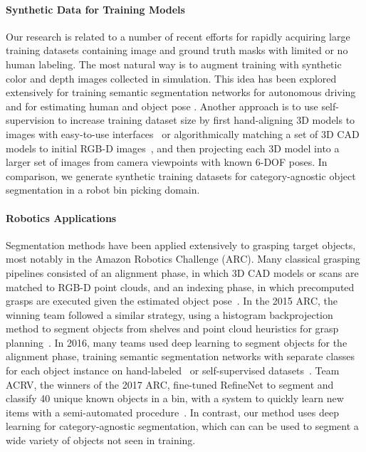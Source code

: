 \documentclass[letterpaper, 10 pt, conference]{ieeeconf}  \pdfoutput=1
\numberwithin{equation}{section}
\begin{document}
\paragraph{Synthetic Data for Training Models}
Our research is related to a number of recent efforts for 
rapidly acquiring large training datasets containing image and 
ground truth masks with limited or no human labeling.
The most natural way is to augment training with synthetic 
color and depth images collected in simulation.
This idea has been explored extensively for training semantic segmentation networks 
for autonomous driving~\cite{johnson2017driving, ros2016synthia} and for estimating human and object pose \cite{shotton2011real, su2015render}.
Another approach is to use self-supervision to increase 
training dataset size by first hand-aligning 3D models 
to images with easy-to-use interfaces~\cite{marion2018pipeline}
or algorithmically matching a set of 3D CAD models 
to initial RGB-D images~\cite{zeng2017multi},
and then projecting each 3D model into a larger 
set of images from camera viewpoints with known 6-DOF poses. In comparison, we generate synthetic training datasets for
category-agnostic object segmentation in a robot bin picking domain.




\paragraph{Robotics Applications}
Segmentation methods have been applied extensively to grasping target objects, most notably in the Amazon Robotics Challenge (ARC).
Many classical grasping pipelines consisted of an alignment phase, in which 3D CAD models or scans are matched to RGB-D point clouds, and an indexing phase, in which precomputed grasps are executed given the estimated object pose~\cite{ciocarlie2014towards}.
In the 2015 ARC, the winning team followed a similar strategy, using a histogram backprojection method to segment objects from shelves and point cloud heuristics for grasp planning~\cite{eppner2016lessons}.
In 2016, many teams used deep learning to segment objects for the alignment phase, training semantic segmentation networks with separate classes for each object instance on hand-labeled~\cite{schwarz2016rgb} or self-supervised datasets~\cite{zeng2017multi}.
Team ACRV, the winners of the 2017 ARC, fine-tuned RefineNet to segment and classify 40 unique known objects in a bin, with a system to quickly learn new items with a semi-automated procedure~\cite{morrison2017cartman,milan2017semantic}.
In contrast, our method uses deep learning for category-agnostic segmentation, which can can be used to segment a wide variety of objects not seen in training. 
\end{document}
